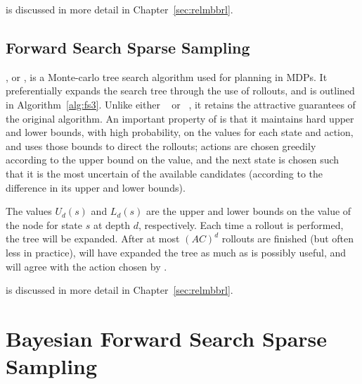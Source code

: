  is discussed in more detail in Chapter~\ref{sec:relmbbrl}.

\subsection{Forward Search Sparse Sampling}

, or , is a Monte-carlo tree search algorithm used for planning in MDPs. It preferentially expands the search tree through the use of rollouts, and is outlined in Algorithm~\ref{alg:fs3}. Unlike either ~\cite{wang05} or ~\cite{kocsis06}, it retains the attractive guarantees of the original  algorithm. An important property of  is that it maintains hard upper and lower bounds, with high probability, on the values for each state and action, and uses those bounds to direct the rollouts; actions are chosen greedily according to the upper bound on the value, and the next state is chosen such that it is the most uncertain of the available candidates (according to the difference in its upper and lower bounds).

The values $U_d(s)$ and $L_d(s)$ are the upper and lower bounds on the value of the node for state $s$ at depth $d$, respectively. Each time a rollout is performed, the tree will be expanded. After at most $(AC)^d$ rollouts are finished (but often less in practice),  will have expanded the tree as much as is possibly useful, and will agree with the action chosen by .

 is discussed in more detail in Chapter~\ref{sec:relmbbrl}.

\section{Bayesian Forward Search Sparse Sampling}

\label{sec:bfs3:bfs3}

